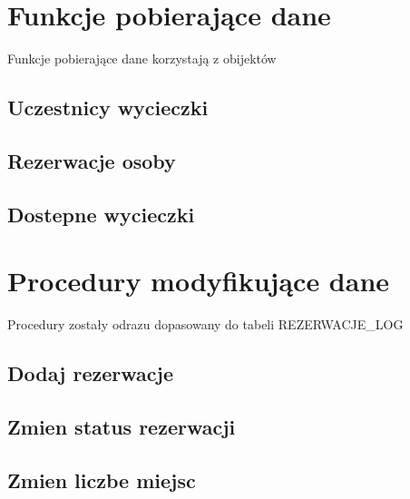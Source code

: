\documentclass[12pt]{article}
\begin{document}
	\section{Funkcje pobierające dane}
	
	Funkcje pobierające dane korzystają z obijektów
	
	\subsection{Uczestnicy wycieczki}
	
	
	\subsection{Rezerwacje osoby}
	
	
	\pagebreak
	
	\subsection{Dostepne wycieczki}
	
	
	\pagebreak
	
	\section{Procedury modyfikujące dane}
	
	Procedury zostały odrazu dopasowany do tabeli REZERWACJE\_LOG
	
	\subsection{Dodaj rezerwacje}
	
	
	\pagebreak
	
	\subsection{Zmien status rezerwacji}
	
	
	\pagebreak
	
	\subsection{Zmien liczbe miejsc}
	
	
\end{document}
